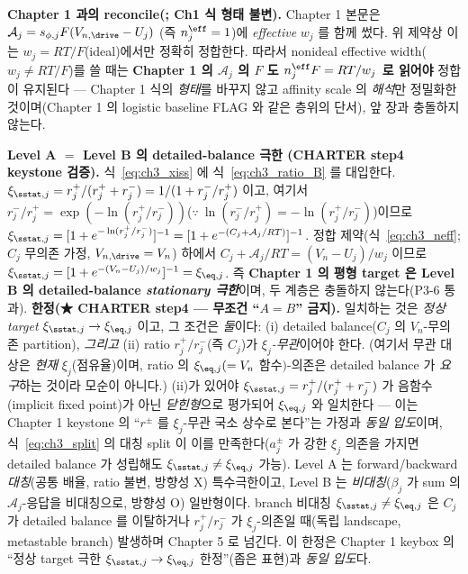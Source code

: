 \begin{boundbox}
\textbf{Chapter 1 과의 reconcile(; Ch1 식 형태 불변).} Chapter 1 본문은 $\mathcal A_j=s_{\phi,j}F(V_{n,\drive}-U_j)$
(즉 $n_j^{\eff}=1$)에 \emph{effective} $w_j$ 를 함께 썼다. 위 제약상 이는 $w_j=RT/F$(ideal)에서만 정확히
정합한다. 따라서 nonideal effective width($w_j\ne RT/F$)를 쓸 때는 \textbf{Chapter 1 의 $\mathcal A_j$ 의 $F$ 도
$n_j^{\eff}F=RT/w_j$ 로 읽어야} 정합이 유지된다 — Chapter 1 식의 \emph{형태}를 바꾸지 않고 affinity scale 의
\emph{해석}만 정밀화한 것이며(Chapter 1 의 logistic baseline FLAG 와 같은 층위의 단서), 앞 장과 충돌하지 않는다.
\end{boundbox}

\begin{verifybox}
\textbf{Level A $=$ Level B 의 detailed-balance 극한 (CHARTER step4 keystone 검증).} 식~\eqref{eq:ch3_xiss} 에
식~\eqref{eq:ch3_ratio_B} 를 대입한다. $\xi_{\sstat,j}=r_j^+/(r_j^++r_j^-)=1/(1+r_j^-/r_j^+)$ 이고, 여기서
$r_j^-/r_j^+=\exp(-\ln(r_j^+/r_j^-))$($\because\ \ln(r_j^-/r_j^+)=-\ln(r_j^+/r_j^-)$)이므로
$\xi_{\sstat,j}=[1+e^{-\ln(r_j^+/r_j^-)}]^{-1}=[1+e^{-(C_j+\mathcal A_j/RT)}]^{-1}$. 정합 제약(식~\eqref{eq:ch3_neff}; $C_j$ 무의존 가정, $V_{n,\drive}=V_n$)
하에서 $C_j+\mathcal A_j/RT=(V_n-U_j)/w_j$ 이므로 $\xi_{\sstat,j}=[1+e^{-(V_n-U_j)/w_j}]^{-1}=\xi_{\eq,j}$. 즉
\textbf{Chapter 1 의 평형 target 은 Level B 의 detailed-balance \emph{stationary 극한}}이며, 두 계층은 충돌하지
않는다(P3-6 통과). \textbf{한정(★ CHARTER step4 — 무조건 ``$A=B$'' 금지).} 일치하는 것은 \emph{정상 target}
$\xi_{\sstat,j}\to\xi_{\eq,j}$ 이고, 그 조건은 \emph{둘}이다: (i) detailed balance($C_j$ 의 $V_n$-무의존 partition),
\emph{그리고} (ii) ratio $r_j^+/r_j^-$(즉 $C_j$)가 $\xi_j$\emph{-무관}이어야 한다. (여기서 무관 대상은 \emph{현재}
$\xi_j$(점유율)이며, ratio 의 $\xi_{\eq,j}(=V_n$ 함수$)$-의존은 detailed balance 가 \emph{요구}하는 것이라
모순이 아니다.) (ii)가 있어야 $\xi_{\sstat,j}=
r_j^+/(r_j^++r_j^-)$ 가 음함수(implicit fixed point)가 아닌 \emph{닫힌형}으로 평가되어 $\xi_{\eq,j}$ 와 일치한다
— 이는 Chapter 1 keystone 의 ``$r^\pm$ 를 $\xi_j$-무관 국소 상수로 본다''는 가정과 \emph{동일 입도}이며,
식~\eqref{eq:ch3_split} 의 대칭 split 이 이를 만족한다($a_j^\pm$ 가 강한 $\xi_j$ 의존을 가지면 detailed balance 가
성립해도 $\xi_{\sstat,j}\ne\xi_{\eq,j}$ 가능). Level A 는 forward/backward \emph{대칭}(공통 배율, ratio 불변,
방향성 X) 특수극한이고, Level B 는 \emph{비대칭}($\beta_j$ 가 sum 의 $\mathcal A_j$-응답을 비대칭으로, 방향성 O)
일반형이다. branch 비대칭 $\xi_{\sstat,j}\ne\xi_{\eq,j}$ 은 $C_j$ 가 detailed balance 를 이탈하거나 $r_j^+/r_j^-$ 가
$\xi_j$-의존일 때(독립 landscape, metastable branch) 발생하며 Chapter 5 로 넘긴다. 이 한정은
Chapter 1 keybox 의 ``정상 target 극한 $\xi_{\sstat,j}\to\xi_{\eq,j}$ 한정''(좁은 표현)과 \emph{동일 입도}다.
\end{verifybox}

